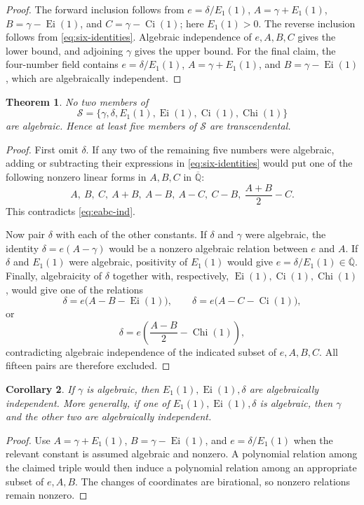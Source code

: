\documentclass[11pt]{article}
\newtheorem{theorem}{Theorem}[section]
\newtheorem{corollary}[theorem]{Corollary}
\theoremstyle{definition}
\theoremstyle{remark}
\newcommand{\Qb}{\overline{\mathbb Q}}
\newcommand{\Ei}{\operatorname{Ei}}
\newcommand{\Ci}{\operatorname{Ci}}
\newcommand{\Chi}{\operatorname{Chi}}
\begin{document}
\begin{proof}
The forward inclusion follows from
\(e=\delta/E_1(1)\), \(A=\gamma+E_1(1)\),
\(B=\gamma-\Ei(1)\), and \(C=\gamma-\Ci(1)\); here
\(E_1(1)>0\).  The reverse inclusion follows from
\eqref{eq:six-identities}.  Algebraic independence of \(e,A,B,C\) gives the
lower bound, and adjoining \(\gamma\) gives the upper bound.  For the final
claim, the four-number field contains
\(e=\delta/E_1(1)\), \(A=\gamma+E_1(1)\), and
\(B=\gamma-\Ei(1)\), which are algebraically independent.
\end{proof}

\begin{theorem}\label{thm:six}
No two members of
\[
 \mathcal S=\{\gamma,\delta,E_1(1),\Ei(1),\Ci(1),\Chi(1)\}
\]
are algebraic.  Hence at least five members of \(\mathcal S\) are
transcendental.
\end{theorem}

\begin{proof}
First omit \(\delta\).  If any two of the remaining five numbers were
algebraic, adding or subtracting their expressions in
\eqref{eq:six-identities} would put one of the following nonzero linear forms
in \(A,B,C\) in \(\Qb\):
\[
 A,\ B,\ C,\ A+B,\ A-B,\ A-C,\ C-B,\ \frac{A+B}{2}-C.
\]
This contradicts \eqref{eq:eabc-ind}.

Now pair \(\delta\) with each of the other constants.  If \(\delta\) and
\(\gamma\) were algebraic, the identity
\(\delta=e(A-\gamma)\) would be a nonzero algebraic relation between \(e\)
and \(A\).  If \(\delta\) and \(E_1(1)\) were algebraic, positivity of
\(E_1(1)\) would give \(e=\delta/E_1(1)\in\Qb\).  Finally, algebraicity of
\(\delta\) together with, respectively, \(\Ei(1),\Ci(1),\Chi(1)\), would give
one of the relations
\[
 \delta=e\bigl(A-B-\Ei(1)\bigr),\qquad
 \delta=e\bigl(A-C-\Ci(1)\bigr),
\]
or
\[
 \delta=e\left(\frac{A-B}{2}-\Chi(1)\right),
\]
contradicting algebraic independence of the indicated subset of
\(e,A,B,C\).  All fifteen pairs are therefore excluded.
\end{proof}

\begin{corollary}\label{cor:conditional-triples}
If \(\gamma\) is algebraic, then \(E_1(1),\Ei(1),\delta\) are algebraically
independent.  More generally, if one of \(E_1(1),\Ei(1),\delta\) is algebraic,
then \(\gamma\) and the other two are algebraically independent.
\end{corollary}

\begin{proof}
Use \(A=\gamma+E_1(1)\), \(B=\gamma-\Ei(1)\), and
\(e=\delta/E_1(1)\) when the relevant constant is assumed algebraic and
nonzero.  A polynomial relation among the claimed triple would then induce a
polynomial relation among an appropriate subset of \(e,A,B\).  The changes of
coordinates are birational, so nonzero relations remain nonzero.
\end{proof}
\end{document}
